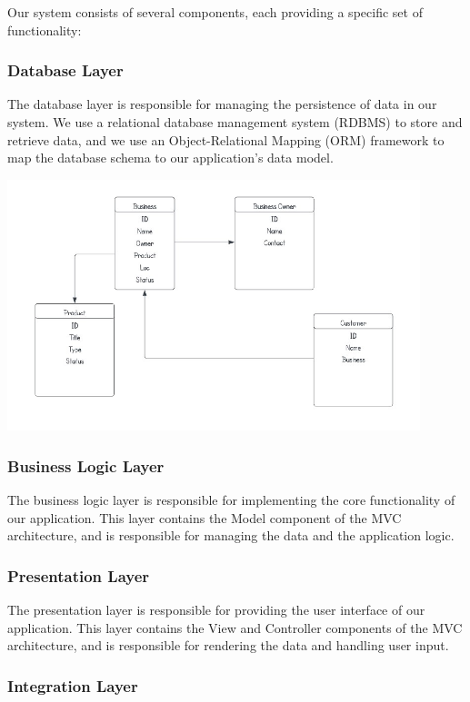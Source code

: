 \documentclass{article}
\begin{document}
Our system consists of several components, each providing a specific set of functionality:

\subsubsection{Database Layer}

The database layer is responsible for managing the persistence of data in our system. We use a relational database management system (RDBMS) to store and retrieve data, and we use an Object-Relational Mapping (ORM) framework to map the database schema to our application's data model.


\includegraphics[width=0.9\textwidth]{db_schema.jpg}
\subsubsection{Business Logic Layer}

The business logic layer is responsible for implementing the core functionality of our application. This layer contains the Model component of the MVC architecture, and is responsible for managing the data and the application logic.

\subsubsection{Presentation Layer}

The presentation layer is responsible for providing the user interface of our application. This layer contains the View and Controller components of the MVC architecture, and is responsible for rendering the data and handling user input.

\subsubsection{Integration Layer}
\end{document}
